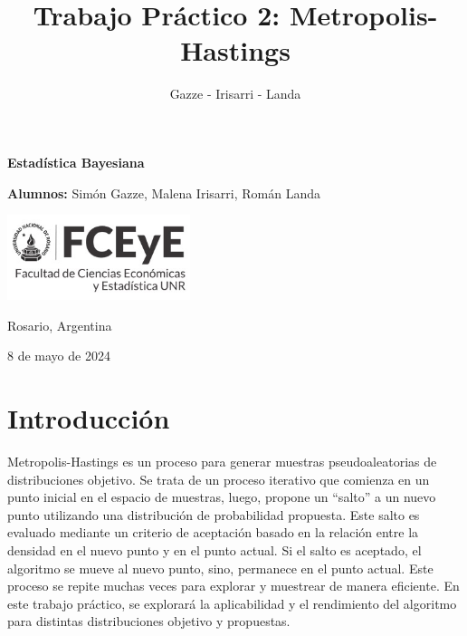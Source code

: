 \documentclass[
]{article}
\title{Trabajo Práctico 2: Metropolis-Hastings}
\author{Gazze - Irisarri - Landa}
\date{}
\begin{document}
\maketitle

\thispagestyle{empty}

\begin{center}
  \vspace*{1cm}

  \Huge
  \textbf{Estadística Bayesiana}

  \vspace{0.5cm}
  \LARGE

  \vspace{1.5cm}

  \textbf{Alumnos:} Simón Gazze, Malena Irisarri, Román Landa\\

  \vfill

  \includegraphics[width=0.4\textwidth]{logo_universidad}

  \vspace{0.8cm}


  Rosario, Argentina

  8 de mayo de 2024
\end{center}

\newpage

\hypertarget{introducciuxf3n}{%
\section{Introducción}\label{introducciuxf3n}}

Metropolis-Hastings es un proceso para generar muestras pseudoaleatorias
de distribuciones objetivo. Se trata de un proceso iterativo que
comienza en un punto inicial en el espacio de muestras, luego, propone
un ``salto'' a un nuevo punto utilizando una distribución de
probabilidad propuesta. Este salto es evaluado mediante un criterio de
aceptación basado en la relación entre la densidad en el nuevo punto y
en el punto actual. Si el salto es aceptado, el algoritmo se mueve al
nuevo punto, sino, permanece en el punto actual. Este proceso se repite
muchas veces para explorar y muestrear de manera eficiente. En este
trabajo práctico, se explorará la aplicabilidad y el rendimiento del
algoritmo para distintas distribuciones objetivo y propuestas.
\end{document}
